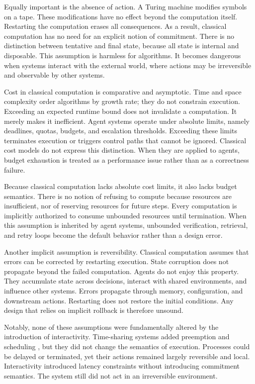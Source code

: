 Equally important is the absence of action. A Turing machine modifies symbols on a
tape. These modifications have no effect beyond the computation itself. Restarting
the computation erases all consequences. As a result, classical computation has no
need for an explicit notion of commitment. There is no distinction between
tentative and final state, because all state is internal and disposable. This
assumption is harmless for algorithms. It becomes dangerous when systems interact
with the external world, where actions may be irreversible and observable by other
systems.

Cost in classical computation is comparative and asymptotic. Time and space
complexity order algorithms by growth rate; they do not constrain execution.
Exceeding an expected runtime bound does not invalidate a computation. It merely
makes it inefficient. Agent systems operate under absolute limits, namely deadlines,
quotas, budgets, and escalation thresholds. Exceeding these limits terminates
execution or triggers control paths that cannot be ignored. Classical cost models
do not express this distinction. When they are applied to agents, budget exhaustion
is treated as a performance issue rather than as a correctness failure.

Because classical computation lacks absolute cost limits, it also lacks budget
semantics. There is no notion of refusing to compute because resources are
insufficient, nor of reserving resources for future steps. Every computation is
implicitly authorized to consume unbounded resources until termination. When this
assumption is inherited by agent systems, unbounded verification, retrieval, and
retry loops become the default behavior rather than a design error.

Another implicit assumption is reversibility. Classical computation assumes that
errors can be corrected by restarting execution. State corruption does not
propagate beyond the failed computation. Agents do not enjoy this property. They
accumulate state across decisions, interact with shared environments, and
influence other systems. Errors propagate through memory, configuration, and
downstream actions. Restarting does not restore the initial conditions. Any design
that relies on implicit rollback is therefore unsound.

Notably, none of these assumptions were fundamentally altered by the introduction
of interactivity. Time-sharing systems added preemption and scheduling
\cite{corbato1962experimental}, but they did not change the semantics of execution.
Processes could be delayed or terminated, yet their actions remained largely
reversible and local. Interactivity introduced latency constraints without
introducing commitment semantics. The system still did not act in an irreversible
environment.

